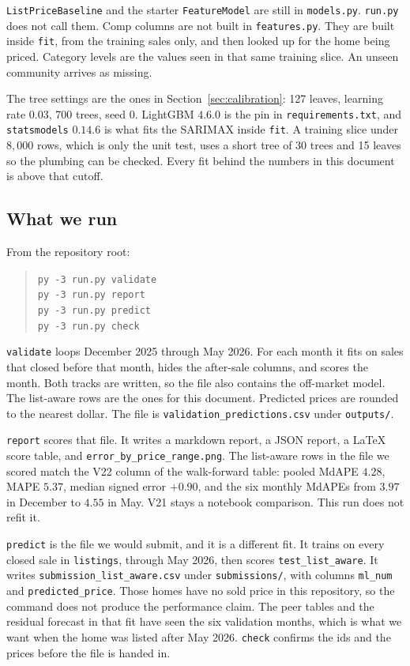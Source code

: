 \documentclass[11pt]{article}
\begin{document}
\texttt{ListPriceBaseline} and the starter \texttt{FeatureModel} are still in \texttt{models.py}. \texttt{run.py} does not call them. Comp columns are not built in \texttt{features.py}. They are built inside \texttt{fit}, from the training sales only, and then looked up for the home being priced. Category levels are the values seen in that same training slice. An unseen community arrives as missing.

The tree settings are the ones in Section~\ref{sec:calibration}: 127 leaves, learning rate \(0.03\), 700 trees, seed \(0\). LightGBM \(4.6.0\) is the pin in \texttt{requirements.txt}, and \texttt{statsmodels} \(0.14.6\) is what fits the SARIMAX inside \texttt{fit}. A training slice under \(8{,}000\) rows, which is only the unit test, uses a short tree of 30 trees and 15 leaves so the plumbing can be checked. Every fit behind the numbers in this document is above that cutoff.

\subsection{What we run}

From the repository root:

\begin{quote}
\texttt{py -3 run.py validate}\\
\texttt{py -3 run.py report}\\
\texttt{py -3 run.py predict}\\
\texttt{py -3 run.py check}
\end{quote}

\texttt{validate} loops December 2025 through May 2026. For each month it fits on sales that closed before that month, hides the after-sale columns, and scores the month. Both tracks are written, so the file also contains the off-market model. The list-aware rows are the ones for this document. Predicted prices are rounded to the nearest dollar. The file is \texttt{validation\_predictions.csv} under \texttt{outputs/}.

\texttt{report} scores that file. It writes a markdown report, a JSON report, a LaTeX score table, and \texttt{error\_by\_price\_range.png}. The list-aware rows in the file we scored match the V22 column of the walk-forward table: pooled MdAPE \(4.28\), MAPE \(5.37\), median signed error \(+0.90\), and the six monthly MdAPEs from \(3.97\) in December to \(4.55\) in May. V21 stays a notebook comparison. This run does not refit it.

\texttt{predict} is the file we would submit, and it is a different fit. It trains on every closed sale in \texttt{listings}, through May 2026, then scores \texttt{test\_list\_aware}. It writes \texttt{submission\_list\_aware.csv} under \texttt{submissions/}, with columns \texttt{ml\_num} and \texttt{predicted\_price}. Those homes have no sold price in this repository, so the command does not produce the performance claim. The peer tables and the residual forecast in that fit have seen the six validation months, which is what we want when the home was listed after May 2026. \texttt{check} confirms the ids and the prices before the file is handed in.
\end{document}
